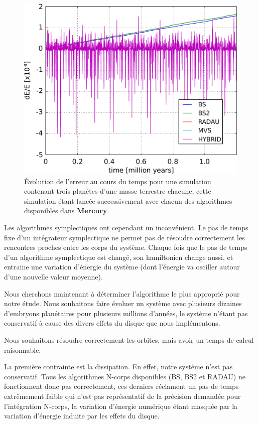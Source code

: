 \begin{figure}[htb]
\centering
\includegraphics[width=0.65\linewidth]{figure/energy_error.pdf}
\caption{Évolution de l'erreur au cours du temps pour une simulation contenant trois planètes d'une masse terrestre chacune, cette simulation étant lancée successivement avec chacun des algorithmes disponibles dans \textbf{Mercury}.}\label{fig:energy_error}
\end{figure}

Les algorithmes symplectiques ont cependant un inconvénient. Le pas de temps fixe d'un intégrateur symplectique ne permet pas de résoudre correctement les rencontres proches entre les corps du système. Chaque fois que le pas de temps d'un algorithme symplectique est changé, son hamiltonien change aussi, et entraine une variation d'énergie du système (dont l'énergie va osciller autour d'une nouvelle valeur moyenne). 

\bigskip

Nous cherchons maintenant à déterminer l'algorithme le plus approprié pour notre étude. Nous souhaitons faire évoluer un système avec plusieurs dizaines d'embryons planétaires pour plusieurs millions d'années, le système n'étant pas conservatif à cause des divers effets du disque que nous implémentons. 

Nous souhaitons résoudre correctement les orbites, mais avoir un temps de calcul raisonnable. 

La première contrainte est la dissipation. En effet, notre système n'est pas conservatif. Tous les algorithmes N-corps disponibles (BS, BS2 et RADAU) ne fonctionnent donc pas correctement, ces derniers réclament un pas de temps extrêmement faible qui n'est pas représentatif de la précision demandée pour l'intégration N-corps, la variation d'énergie numérique étant masquée par la variation d'énergie induite par les effets du disque. 

